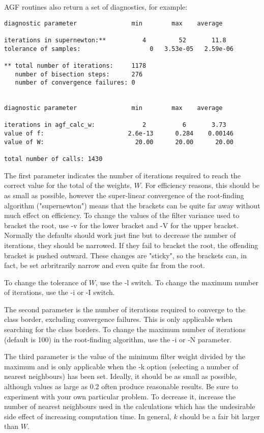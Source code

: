 \documentclass[12pt]{article}
\begin{document}
  AGF routines also return a set of diagnostics, for example:

\begin{verbatim}
diagnostic parameter               min        max    average

iterations in supernewton:**          4         52       11.8
tolerance of samples:                   0   3.53e-05   2.59e-06

** total number of iterations:     1178
   number of bisection steps:      276
   number of convergence failures: 0


diagnostic parameter               min        max    average

iterations in agf_calc_w:             2          6       3.73
value of f:                       2.6e-13      0.284    0.00146
value of W:                         20.00      20.00      20.00

total number of calls: 1430

\end{verbatim}

  The first parameter indicates the number of iterations required to reach the correct value for the total of the weights, $W$.  For efficiency reasons, this should be as small as possible, however the super-linear convergence of the root-finding algorithm ("supernewton") means that the brackets can be quite far away without much effect on efficiency.  To change the values of the filter variance used to bracket the root, use -v for the lower bracket and -V for the upper bracket.  Normally the defaults should work just fine but to decrease the number of iterations, they should be narrowed.  If they fail to bracket the root, the offending bracket is pushed outward.  These changes are "sticky", so the brackets can, in fact, be set arbritrarily narrow and even quite far from the root.

  To change the tolerance of $W$, use the -l switch.  To change the maximum number of iterations, use the -i or -I switch.

  The second parameter is the number of iterations required to converge to the class border, excluding convergence failures.  This is only applicable when searching for the class borders.  To change the maximum number of iterations (default is 100) in the root-finding algorithm, use the -i or -N parameter.

  The third parameter is the value of the minimum filter weight divided by the maximum and is only applicable when the -k option (selecting a number of nearest neighbours) has been set.  Ideally, it should be as small as possible, although values as large as 0.2 often produce reasonable results.  Be sure to experiment with your own particular problem.  To decrease it, increase the number of nearest neighbours used in the calculations which has the undesirable side effect of increasing computation time.  In general, $k$ should be a fair bit larger than $W$.
\end{document}
